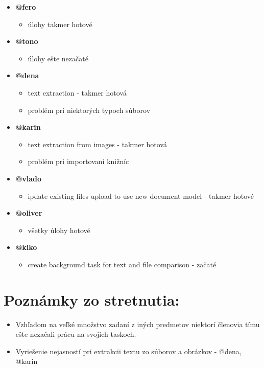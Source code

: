 \documentclass{article}
\begin{document}
    \begin{itemize}
        \item \textbf {@fero}
        \begin{itemize}
            \item úlohy takmer hotové
        \end{itemize}
        \item \textbf {@tono}
        \begin{itemize}
            \item úlohy ešte nezačaté 
        \end{itemize}
        \item \textbf {@dena}
        \begin{itemize}
            \item text extraction - takmer hotová
            \item problém pri niektorých typoch súborov
        \end{itemize}
        \item \textbf {@karin}
        \begin{itemize}
            \item text extraction from images - takmer hotová
            \item problém pri importovaní knižníc
        \end{itemize}
        \item \textbf {@vlado}
        \begin{itemize}
            \item ipdate existing files upload to use new document model - takmer hotové
        \end{itemize}
        \item \textbf {@oliver}
        \begin{itemize}
            \item všetky úlohy hotové
        \end{itemize}
        \item \textbf {@kiko}
        \begin{itemize}
            \item create background task for text and file comparison - začaté
        \end{itemize}
    \end{itemize}    

    \section*{Poznámky zo stretnutia:}

    \begin{itemize}
        \item Vzhľadom na veľké množstvo zadaní z iných predmetov niektorí členovia tímu ešte nezačali prácu na svojich taskoch.
        \item Vyriešenie nejasností pri extrakcii textu zo súborov a obrázkov - @dena, @karin
    \end{itemize}
\end{document}
